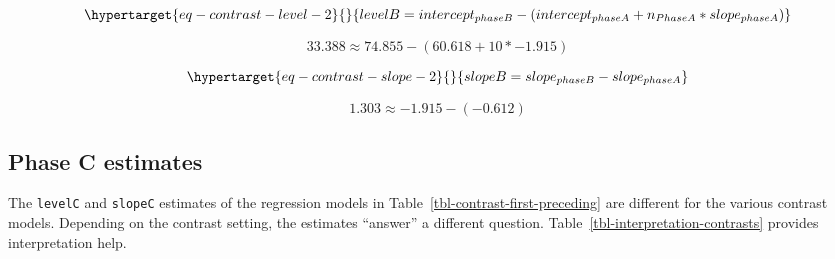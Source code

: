 \documentclass[
  letterpaper,
  DIV=11,
  numbers=noendperiod]{scrreprt}
\begin{document}
\begin{equation}\protect\hypertarget{eq-contrast-level-2}{}{
levelB = intercept_{phaseB} - (intercept_{phaseA} + n_{PhaseA} * slope_{phaseA})
}\label{eq-contrast-level-2}\end{equation}

\[
33.388 \approx  74.855 - (60.618 + 10*-1.915)
\]

\begin{equation}\protect\hypertarget{eq-contrast-slope-2}{}{
slopeB = slope_{phaseB} - slope_{phaseA}
}\label{eq-contrast-slope-2}\end{equation}

\[
1.303 \approx -1.915 - (-0.612) 
\]

\hypertarget{phase-c-estimates}{%
\subsection{Phase C estimates}\label{phase-c-estimates}}

The \texttt{levelC} and \texttt{slopeC} estimates of the regression
models in Table~\ref{tbl-contrast-first-preceding} are different for the
various contrast models. Depending on the contrast setting, the
estimates ``answer'' a different question.
Table~\ref{tbl-interpretation-contrasts} provides interpretation help.
\end{document}
